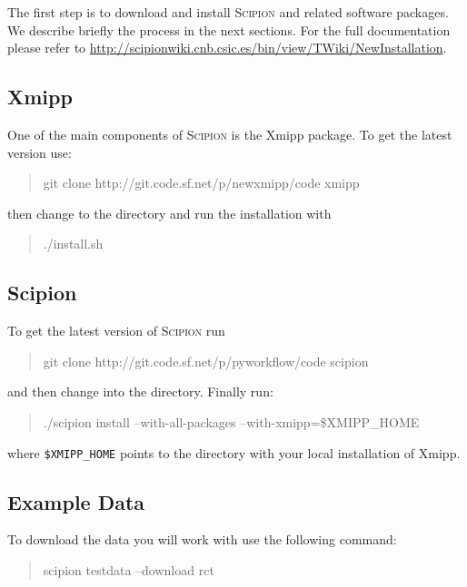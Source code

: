 \documentclass[12pt]{article} %
\newcommand{\scipion}{\textsc{Scipion} }
\newenvironment{command}{\tt\begin{quote}}{\end{quote}}
\begin{document}
The first step is to download and install \scipion and related
software packages. We describe briefly the process in the next
sections. For the full documentation please refer to
\url{http://scipionwiki.cnb.csic.es/bin/view/TWiki/NewInstallation}.

\subsection{Xmipp}

One of the main components of \scipion is the Xmipp package. To get
the latest version use:

\begin{command}
git clone http://git.code.sf.net/p/newxmipp/code xmipp
\end{command}

\noindent
then change to the  directory and run the installation with

\begin{command}
./install.sh
\end{command}

\subsection{Scipion}

To get the latest version of \scipion run

\begin{command}
git clone http://git.code.sf.net/p/pyworkflow/code scipion
\end{command}

\noindent
and then change into the  directory. Finally run:

\begin{command}
./scipion install --with-all-packages --with-xmipp=\$XMIPP\_HOME
\end{command}

\noindent
where \verb+$XMIPP_HOME+ points to the directory with your local
installation of Xmipp.

\subsection{Example Data}

To download the data you will work with use the following command:

\begin{command}
scipion testdata --download rct
\end{command}
\end{document}
